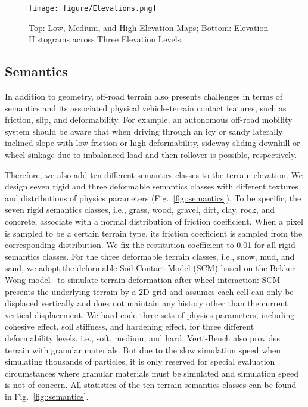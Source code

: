 \begin{figure}[ht]
    \centering
    \texttt{[image: figure/Elevations.png]}
    \caption{Top: Low, Medium, and High Elevation Maps; Bottom: Elevation Histograms across Three Elevation Levels. }
    \label{fig::elevation}
\end{figure}


\subsection{Semantics}
In addition to geometry, off-road terrain also presents challenges in terms of semantics and its associated physical vehicle-terrain contact features, such as friction, slip, and deformability. 
For example, an autonomous off-road mobility system should be aware that when driving through an icy or sandy laterally inclined slope with low friction or high deformability, sideway sliding downhill or wheel sinkage due to imbalanced load and then rollover is possible, respectively.  

Therefore, we also add ten different semantics classes to the terrain elevation. We design seven rigid and three deformable semantics classes with different textures and distributions of physics parameters (Fig.~\ref{fig::semantics}). To be specific, the seven rigid semantics classes, i.e., grass, wood, gravel, dirt, clay, rock, and concrete, associate with a normal distribution of friction coefficient. When a pixel is sampled to be a certain terrain type, its friction coefficient is sampled from the corresponding distribution. We fix the restitution coefficient to 0.01 for all rigid semantics classes. For the three deformable terrain classes, i.e., snow, mud, and sand, we adopt the deformable Soil Contact Model (SCM) based on the Bekker-Wong model~\cite{laughery1990bekker} to simulate terrain deformation after wheel interaction: SCM presents the underlying terrain by a 2D grid and assumes each cell can only be displaced vertically and does not maintain any history other than the current vertical displacement. We hard-code three sets of physics parameters, including cohesive effect, soil stiffness, and hardening effect, for three different deformability levels, i.e., soft, medium, and hard. 
Verti-Bench also provides terrain with granular materials. But due to the slow simulation speed when simulating thousands of particles, it is only reserved for special evaluation circumstances where granular materials must be simulated and simulation speed is not of concern. All statistics of the ten terrain semantics classes can be found in Fig.~\ref{fig::semantics}. 

